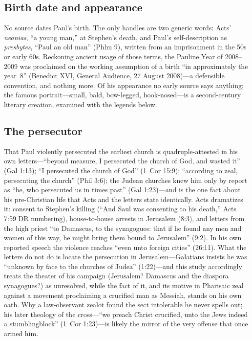 \subsection{Birth date and appearance}

No source dates Paul's birth. The only handles are two generic words:
Acts' \textit{neanias}, ``a young man,'' at Stephen's death, and Paul's
self-description as \textit{presbytes}, ``Paul an old man'' (Phlm 9),
written from an imprisonment in the 50s or early 60s. Reckoning ancient
usage of those terms, the Pauline Year of 2008--2009 was proclaimed on the
working assumption of a birth ``in approximately the year~8'' (Benedict
XVI, General Audience, 27 August 2008)---a defensible convention, and
nothing more. Of his appearance no early source says anything; the famous
portrait---small, bald, bow-legged, hook-nosed---is a second-century
literary creation, examined with the legends below.

\subsection{The persecutor}

That Paul violently persecuted the earliest church is quadruple-attested
in his own letters---``beyond measure, I persecuted the church of God, and
wasted it'' (Gal 1:13); ``I persecuted the church of God'' (1~Cor 15:9);
``according to zeal, persecuting the church'' (Phil 3:6); the Judean
churches knew him only by report as ``he, who persecuted us in times
past'' (Gal 1:23)---and is the one fact about his pre-Christian life that
Acts and the letters state identically. Acts dramatizes it: consent to
Stephen's killing (``And Saul was consenting to his death,'' Acts 7:59
DR numbering), house-to-house arrests in Jerusalem (8:3), and letters from
the high priest ``to Damascus, to the synagogues: that if he found any men
and women of this way, he might bring them bound to Jerusalem'' (9:2). In
his own reported speech the violence reaches ``even unto foreign cities''
(26:11). What the letters do not do is locate the persecution in
Jerusalem---Galatians insists he was ``unknown by face to the churches of
Judea'' (1:22)---and this study accordingly treats the theater of his
campaign (Jerusalem? Damascus and the diaspora synagogues?) as unresolved,
while the fact of it, and its motive in Pharisaic zeal against a movement
proclaiming a crucified man as Messiah, stands on his own oath. Why a
law-observant zealot found the sect intolerable he never spells out; his
later theology of the cross---``we preach Christ crucified, unto the Jews
indeed a stumblingblock'' (1~Cor 1:23)---is likely the mirror of the very
offense that once armed him.

